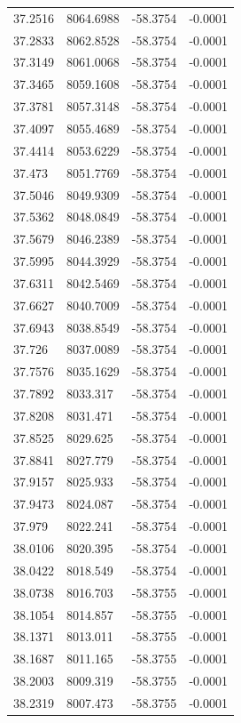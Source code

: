 \begin{table}[H]
\begin{tabular}{llll}
37.2516 & 8064.6988 & -58.3754 & -0.0001 \\
37.2833 & 8062.8528 & -58.3754 & -0.0001 \\
37.3149 & 8061.0068 & -58.3754 & -0.0001 \\
37.3465 & 8059.1608 & -58.3754 & -0.0001 \\
37.3781 & 8057.3148 & -58.3754 & -0.0001 \\
37.4097 & 8055.4689 & -58.3754 & -0.0001 \\
37.4414 & 8053.6229 & -58.3754 & -0.0001 \\
37.473 & 8051.7769 & -58.3754 & -0.0001 \\
37.5046 & 8049.9309 & -58.3754 & -0.0001 \\
37.5362 & 8048.0849 & -58.3754 & -0.0001 \\
37.5679 & 8046.2389 & -58.3754 & -0.0001 \\
37.5995 & 8044.3929 & -58.3754 & -0.0001 \\
37.6311 & 8042.5469 & -58.3754 & -0.0001 \\
37.6627 & 8040.7009 & -58.3754 & -0.0001 \\
37.6943 & 8038.8549 & -58.3754 & -0.0001 \\
37.726 & 8037.0089 & -58.3754 & -0.0001 \\
37.7576 & 8035.1629 & -58.3754 & -0.0001 \\
37.7892 & 8033.317 & -58.3754 & -0.0001 \\
37.8208 & 8031.471 & -58.3754 & -0.0001 \\
37.8525 & 8029.625 & -58.3754 & -0.0001 \\
37.8841 & 8027.779 & -58.3754 & -0.0001 \\
37.9157 & 8025.933 & -58.3754 & -0.0001 \\
37.9473 & 8024.087 & -58.3754 & -0.0001 \\
37.979 & 8022.241 & -58.3754 & -0.0001 \\
38.0106 & 8020.395 & -58.3754 & -0.0001 \\
38.0422 & 8018.549 & -58.3754 & -0.0001 \\
38.0738 & 8016.703 & -58.3755 & -0.0001 \\
38.1054 & 8014.857 & -58.3755 & -0.0001 \\
38.1371 & 8013.011 & -58.3755 & -0.0001 \\
38.1687 & 8011.165 & -58.3755 & -0.0001 \\
38.2003 & 8009.319 & -58.3755 & -0.0001 \\
38.2319 & 8007.473 & -58.3755 & -0.0001 \\

\end{tabular}
\end{table}
